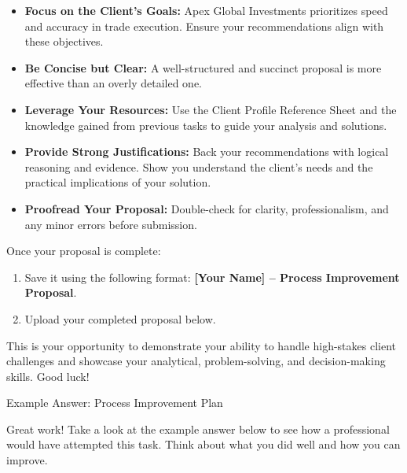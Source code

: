 \documentclass[11pt]{article}
\begin{document}
\begin{itemize}[leftmargin=1.5em, itemsep=2pt]
  \item \textbf{Focus on the Client's Goals:} Apex Global Investments
  prioritizes speed and accuracy in trade execution. Ensure your
  recommendations align with these objectives.
  \item \textbf{Be Concise but Clear:} A well-structured and succinct proposal
  is more effective than an overly detailed one.
  \item \textbf{Leverage Your Resources:} Use the Client Profile Reference
  Sheet and the knowledge gained from previous tasks to guide your analysis
  and solutions.
  \item \textbf{Provide Strong Justifications:} Back your recommendations with
  logical reasoning and evidence. Show you understand the client's needs and
  the practical implications of your solution.
  \item \textbf{Proofread Your Proposal:} Double-check for clarity,
  professionalism, and any minor errors before submission.
\end{itemize}

Once your proposal is complete:
\begin{enumerate}[leftmargin=1.5em, itemsep=2pt]
  \item Save it using the following format: \textbf{[Your Name] -- Process
  Improvement Proposal}.
  \item Upload your completed proposal below.
\end{enumerate}
This is your opportunity to demonstrate your ability to handle high-stakes
client challenges and showcase your analytical, problem-solving, and
decision-making skills. Good luck!\par\medskip


\newpage
{\fontsize{26}{30}\selectfont Example Answer: Process Improvement Plan}\par\bigskip

Great work! Take a look at the example answer below to see how a professional
would have attempted this task. Think about what you did well and how you can
improve.
\end{document}
